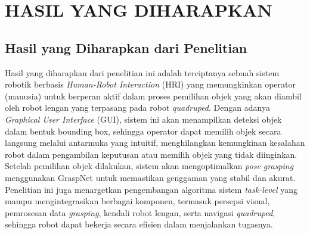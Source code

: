 \chapter{HASIL YANG DIHARAPKAN}

\section{Hasil yang Diharapkan dari Penelitian}

Hasil yang diharapkan dari penelitian ini adalah terciptanya sebuah sistem robotik berbasis
\emph{Human-Robot Interaction} (HRI) yang memungkinkan operator (manusia) untuk berperan aktif
dalam proses pemilihan objek yang akan diambil oleh robot lengan yang terpasang pada robot
\emph{quadruped}. Dengan adanya \emph{Graphical User Interface} (GUI), sistem ini akan menampilkan
deteksi objek dalam bentuk bounding box, sehingga operator dapat memilih objek secara langsung melalui
antarmuka yang intuitif, menghilangkan kemungkinan kesalahan robot dalam pengambilan keputusan atau
memilih objek yang tidak diinginkan. Setelah pemilihan objek dilakukan, sistem akan mengoptimalkan
\emph{pose grasping} menggunakan GraspNet untuk memastikan genggaman yang stabil dan akurat. Penelitian
ini juga menargetkan pengembangan algoritma sistem \emph{task-level} yang mampu mengintegrasikan berbagai komponen,
termasuk persepsi visual, pemrosesan data \emph{grasping}, kendali robot lengan, serta navigasi \emph{quadruped},
sehingga robot dapat bekerja secara efisien dalam menjalankan tugasnya.

